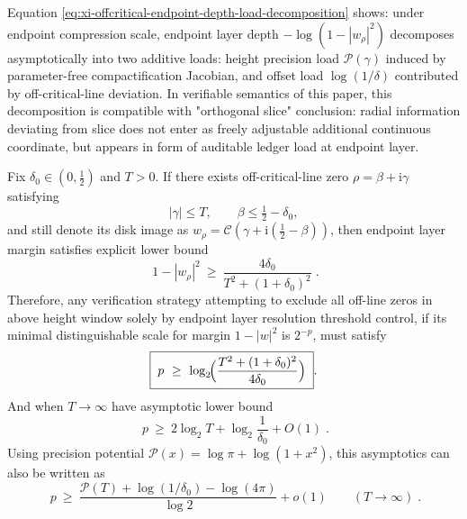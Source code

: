\begin{remark}\label{rem:xi-offcritical-endpoint-depth-additive-load}
Equation \eqref{eq:xi-offcritical-endpoint-depth-load-decomposition} shows: under endpoint compression scale, endpoint layer depth \(-\log(1-|w_\rho|^2)\) decomposes asymptotically into two additive loads: height precision load \(\mathcal{P}(\gamma)\) induced by parameter-free compactification Jacobian, and offset load \(\log(1/\delta)\) contributed by off-critical-line deviation.
In verifiable semantics of this paper, this decomposition is compatible with "orthogonal slice" conclusion: radial information deviating from slice does not enter as freely adjustable additional continuous coordinate, but appears in form of auditable ledger load at endpoint layer.
\end{remark}

\begin{theorem}\label{thm:xi-offcritical-endpoint-resolution-lower-bound}
Fix \(\delta_0\in(0,\tfrac12)\) and \(T>0\).
If there exists off-critical-line zero \(\rho=\beta+\mathrm{i}\gamma\) satisfying
\[
|\gamma|\le T,\qquad \beta\le \tfrac12-\delta_0,
\]
and still denote its disk image as \(w_\rho=\mathcal{C}(\gamma+\mathrm{i}(\tfrac12-\beta))\), then endpoint layer margin satisfies explicit lower bound
\begin{equation}\label{eq:xi-offcritical-endpoint-margin-min}
\boxed{\;
1-|w_\rho|^2\ \ge\ \frac{4\delta_0}{T^2+(1+\delta_0)^2}\; }.
\end{equation}
Therefore, any verification strategy attempting to exclude all off-line zeros in above height window solely by endpoint layer resolution threshold control, if its minimal distinguishable scale for margin \(1-|w|^2\) is \(2^{-p}\), must satisfy
\begin{equation}\label{eq:xi-offcritical-endpoint-bit-lower-bound}
\boxed{\;
p\ \ge\ \log_2\!\Bigl(\frac{T^2+(1+\delta_0)^2}{4\delta_0}\Bigr)\; }.
\end{equation}
And when \(T\to\infty\) have asymptotic lower bound
\begin{equation}\label{eq:xi-offcritical-endpoint-bit-asymptotic}
\boxed{\;
p\ \ge\ 2\log_2 T+\log_2\!\frac{1}{\delta_0}+O(1)\; }.
\end{equation}
Using precision potential \(\mathcal{P}(x)=\log\pi+\log(1+x^2)\), this asymptotics can also be written as
\begin{equation}\label{eq:xi-offcritical-endpoint-bit-precision-potential-form}
\boxed{\;
p\ \ge\ \frac{\mathcal{P}(T)+\log(1/\delta_0)-\log(4\pi)}{\log 2}+o(1)\qquad(T\to\infty)\; }.
\end{equation}
\end{theorem}


